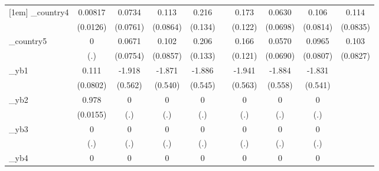\begin{table}[htbp]
\begin{tabular}{l*{9}{c}}
[1em]
\_country4   &     0.00817         &      0.0734         &       0.113         &       0.216         &                     &       0.173         &      0.0630         &       0.106         &       0.114         \\
            &    (0.0126)         &    (0.0761)         &    (0.0864)         &     (0.134)         &                     &     (0.122)         &    (0.0698)         &    (0.0814)         &    (0.0835)         \\
[1em]
\_country5   &           0         &      0.0671         &       0.102         &       0.206         &                     &       0.166         &      0.0570         &      0.0965         &       0.103         \\
            &         (.)         &    (0.0754)         &    (0.0857)         &     (0.133)         &                     &     (0.121)         &    (0.0690)         &    (0.0807)         &    (0.0827)         \\
[1em]
\_yb1        &       0.111         &      -1.918\sym{***}&      -1.871\sym{***}&      -1.886\sym{***}&                     &      -1.941\sym{***}&      -1.884\sym{***}&      -1.831\sym{***}&                     \\
            &    (0.0802)         &     (0.562)         &     (0.540)         &     (0.545)         &                     &     (0.563)         &     (0.558)         &     (0.541)         &                     \\
[1em]
\_yb2        &       0.978\sym{***}&           0         &           0         &           0         &                     &           0         &           0         &           0         &                     \\
            &    (0.0155)         &         (.)         &         (.)         &         (.)         &                     &         (.)         &         (.)         &         (.)         &                     \\
[1em]
\_yb3        &           0         &           0         &           0         &           0         &                     &           0         &           0         &           0         &                     \\
            &         (.)         &         (.)         &         (.)         &         (.)         &                     &         (.)         &         (.)         &         (.)         &                     \\
[1em]
\_yb4        &           0         &           0         &           0         &           0         &                     &           0         &           0         &           0         &                     \\

\end{tabular}
\end{table}
